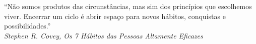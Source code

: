 
\begin{epigrafe}
    \vspace*{\fill}
    \begin{flushright}
        “Não somos produtos das circunstâncias, mas sim dos princípios que escolhemos viver. Encerrar um ciclo é abrir espaço para novos hábitos, conquistas e possibilidades.” \\
        \textit{Stephen R. Covey, Os 7 Hábitos das Pessoas Altamente Eficazes}
    \end{flushright}
\end{epigrafe}

